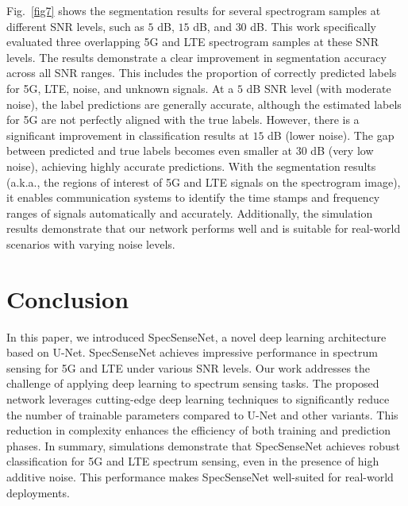 \documentclass[conference]{IEEEtran} %
\begin{document}
Fig.~\ref{fig7} shows the segmentation results for several spectrogram samples at different SNR levels, such as $5$ dB, $15$ dB, and $30$ dB. This work specifically evaluated three overlapping 5G and LTE spectrogram samples at these SNR levels. The results demonstrate a clear improvement in segmentation accuracy across all SNR ranges. This includes the proportion of correctly predicted labels for 5G, LTE, noise, and unknown signals. At a $5$ dB SNR level (with moderate noise), the label predictions are generally accurate, although the estimated labels for 5G are not perfectly aligned with the true labels. However, there is a significant improvement in classification results at $15$ dB (lower noise). The gap between predicted and true labels becomes even smaller at $30$ dB (very low noise), achieving highly accurate predictions. With the segmentation results (a.k.a., the regions of interest of 5G and LTE signals on the spectrogram image), it enables communication systems to identify the time stamps and frequency ranges of signals automatically and accurately.
Additionally, the simulation results demonstrate that our network performs well and is suitable for real-world scenarios with varying noise levels.

\section{Conclusion}
In this paper, we introduced SpecSenseNet, a novel deep learning architecture based on U-Net. SpecSenseNet achieves impressive performance in spectrum sensing for 5G and LTE under various SNR levels.  Our work addresses the challenge of applying deep learning to spectrum sensing tasks. The proposed network leverages cutting-edge deep learning techniques to significantly reduce the number of trainable parameters compared to U-Net and other variants. This reduction in complexity enhances the efficiency of both training and prediction phases. In summary, simulations demonstrate that SpecSenseNet achieves robust classification for 5G and LTE spectrum sensing, even in the presence of high additive noise. This performance makes SpecSenseNet well-suited for real-world deployments.



\end{document}

